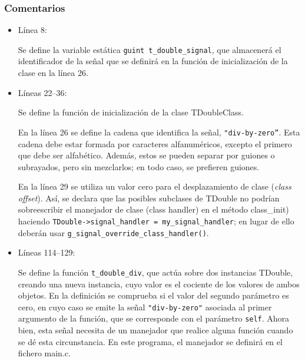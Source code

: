 \subsubsection{Comentarios}
\begin{itemize}
\item Línea 8:\par
  Se define la variable estática \texttt{guint t\_double\_signal}, que almacenerá el identificador de la
  señal que se definirá en la función de inicialización de la clase en la línea 26.
\item Líneas 22--36:\par
  Se define la función de inicialización de la clase \textsf{TDoubleClass}.
  
  En la línea 26 se define la cadena que identifica la señal, \texttt{"div-by-zero''}.
  Esta cadena debe estar formada por caracteres alfanuméricos, excepto el primero que debe ser
  alfabético. Además, estos se pueden separar por guiones o subrayados, pero sin mezclarlos; en
  todo caso, se prefieren guiones.
  
  En la línea 29 se utiliza un valor cero para el desplazamiento de clase (\emph{class offset}).
  Así, se declara que  las posibles subclases de \textsf{TDouble} no podrían sobreescribir
  el manejador de clase (\textsf{class handler}) en el método \textsf{class\_init}) haciendo
  \texttt{TDouble->signal\_handler = my\_signal\_handler}; en lugar de ello deberán usar
  \texttt{g\_signal\_override\_class\_handler()}.
\item Líneas 114--129:\par
  Se define la función \texttt{t\_double\_div}, que actúa sobre dos instancias \textsf{TDouble},
  creando una nueva instancia, cuyo valor es el cociente de los valores de ambos objetos.
  En la definición se comprueba si el valor del segundo parámetro es cero, en cuyo caso se
  emite la señal \texttt{"div-by-zero"} asociada al primer argumento de la función, que se
  corresponde con el parámetro \texttt{self}. Ahora bien, esta señal necesita de un manejador que
  realice alguna función cuando se dé esta circunstancia. En este programa, el manejador se
  definirá en el fichero \textsf{main.c}.
\end{itemize}

